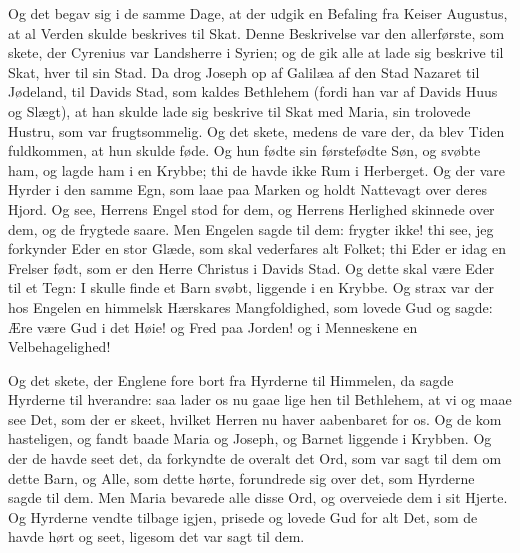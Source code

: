 \documentclass[12pt,a4paper]{book}
\begin{document}
\begingroup\large
Og det begav sig i de samme Dage, at der udgik en Befaling fra Keiser Augustus,
at al Verden skulde beskrives til Skat. Denne Beskrivelse var den allerførste,
som skete, der Cyrenius var Landsherre i Syrien; og de gik alle at lade sig
beskrive til Skat, hver til sin Stad. Da drog Joseph op af Galilæa af den Stad
Nazaret til Jødeland, til Davids Stad, som kaldes Bethlehem (fordi han var af
Davids Huus og Slægt), at han skulde lade sig beskrive til Skat med Maria, sin
trolovede Hustru, som var frugtsommelig. Og det skete, medens de vare der, da
blev Tiden fuldkommen, at hun skulde føde. Og hun fødte sin førstefødte Søn, og
svøbte ham, og lagde ham i en Krybbe; thi de havde ikke Rum i Herberget. Og der
vare Hyrder i den samme Egn, som laae paa Marken og holdt Nattevagt over deres
Hjord. Og see, Herrens Engel stod for dem, og Herrens Herlighed skinnede over
dem, og de frygtede saare. Men Engelen sagde til dem: frygter ikke! thi see, jeg
forkynder Eder en stor Glæde, som skal vederfares alt Folket; thi Eder er idag en
Frelser født, som er den Herre Christus i Davids Stad. Og dette skal være Eder
til et Tegn: I skulle finde et Barn svøbt, liggende i en Krybbe. Og strax var der
hos Engelen en himmelsk Hærskares Mangfoldighed, som lovede Gud og sagde: Ære
være Gud i det Høie! og Fred paa Jorden! og i Menneskene en Velbehagelighed!

Og det skete, der Englene fore bort fra Hyrderne til Himmelen, da sagde Hyrderne
til hverandre: saa lader os nu gaae lige hen til Bethlehem, at vi og maae see
Det, som der er skeet, hvilket Herren nu haver aabenbaret for os. Og de kom
hasteligen, og fandt baade Maria og Joseph, og Barnet liggende i Krybben. Og der
de havde seet det, da forkyndte de overalt det Ord, som var sagt til dem om dette
Barn, og Alle, som dette hørte, forundrede sig over det, som Hyrderne sagde til
dem. Men Maria bevarede alle disse Ord, og overveiede dem i sit Hjerte. Og
Hyrderne vendte tilbage igjen, prisede og lovede Gud for alt Det, som de havde
hørt og seet, ligesom det var sagt til dem.
\par\endgroup
\end{document}
